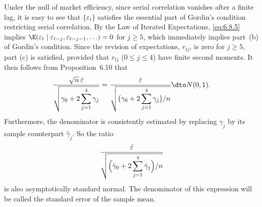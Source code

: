 Under the null of market efficiency, since serial correlation vanishes after a
finite lag, it is easy to see that $\{\varepsilon_t\}$ satisfies the essential part of Gordin's condition
restricting serial correlation. By the Law of Iterated Expectations, \eqref{eq:6.8.5} implies
$\E(\varepsilon_t \mid \varepsilon_{t-j}, \varepsilon_{t-j-1}, \ldots) = 0$ for $j \geq 5$, which immediately implies part~(b) of
Gordin's condition. Since the revision of expectations, $r_{tj}$, is zero for $j \geq 5$, part
(c) is satisfied, provided that $r_{tj}$ ($0 \leq j \leq 4$) have finite second moments. It then
follows from Proposition~6.10 that
\begin{equation}
  \frac{\sqrt{n}\,\bar{\varepsilon}}{\sqrt{\gamma_0 + 2 \displaystyle\sum_{j=1}^{4} \gamma_j}}
  = \frac{\bar{\varepsilon}}{\sqrt{\bigl(\gamma_0 + 2 \displaystyle\sum_{j=1}^{4} \gamma_j\bigr)/n}}
  \dto N(0, 1).
  \label{eq:6.8.6}
\end{equation}
Furthermore, the denominator is consistently estimated by replacing $\gamma_j$ by its sample
counterpart $\hat{\gamma}_j$. So the ratio
\begin{equation}
  \frac{\bar{\varepsilon}}{\sqrt{\Bigl(\hat{\gamma}_0 + 2 \displaystyle\sum_{j=1}^{4} \hat{\gamma}_j\Bigr)/n}}
  \label{eq:6.8.7}
\end{equation}
is also asymptotically standard normal. The denominator of this expression will be
called the standard error of the sample mean.

